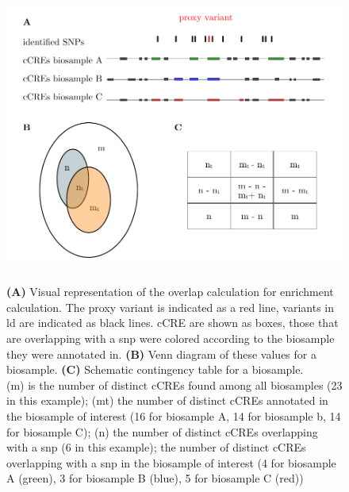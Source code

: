 \begin{figure}[h]
\capstart
    \centering
    \includegraphics{Abbildung/enrichment.pdf}

    \begin{minipage}{\captionwidth}
        \caption[enrichment]{\\
        \textbf{(A)} Visual representation of the overlap calculation for enrichment calculation. The proxy variant is indicated as a red line, variants in \ac{ld} are indicated as black lines. \ac{cCRE} are shown as boxes, those that are overlapping with a \ac{snp} were colored according to the biosample they were annotated in. \textbf{(B)} Venn diagram of these values for a biosample. \textbf{(C)} Schematic contingency table for a biosample. \\
        (m) is the number of distinct \acp{cCRE} found among all biosamples (23 in this example); (mt) the number of distinct \acp{cCRE} annotated in the biosample of interest (16 for biosample A, 14 for biosample b, 14 for biosample C); (n) the number of distinct \acp{cCRE} overlapping with a \ac{snp} (6 in this example);  the number of distinct \acp{cCRE} overlapping with a \ac{snp} in the biosample of interest (4 for biosample A (green), 3 for biosample B (blue), 5 for biosample C (red))}
        \label{fig:enrichment}
    \end{minipage}
\end{figure}
